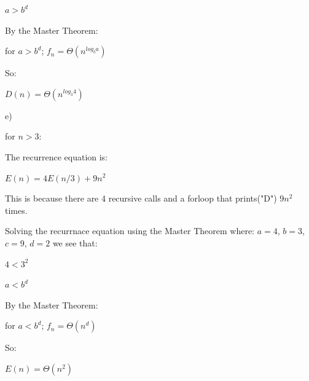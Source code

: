 \documentclass{article}
\begin{document}
\begin{solution}
$a > b^d$
\newline

By the Master Theorem:
\newline

for $a > b^d$; $f_n = \Theta(n^{log_b a})$
\newline

So:
\newline

$D(n) = \Theta(n^{log_3 4})$
\newline

e)
\newline

for $n > 3$:
\newline

The recurrence equation is:
\newline

$E(n) = 4E(n/3) + 9n^2$
\newline

This is because there are 4 recursive calls and a forloop that prints("D") $9n^2$ times.
\newline

\indent Solving the recurrnace equation using the Master Theorem where: $a=4$, $b=3$, $c=9$, $d=2$  we see that:
\newline

$4<3^2$
\newline

$a<b^d$
\newline

By the Master Theorem:
\newline

for $a < b^d$; $f_n = \Theta(n^d)$
\newline

So:
\newline

$E(n) = \Theta(n^2)$
\newline



\end{solution}
\end{document}
